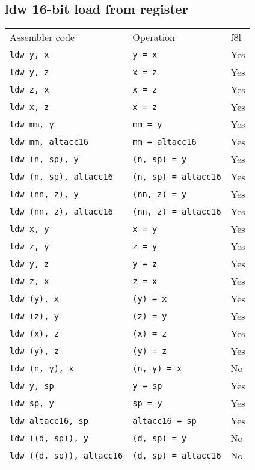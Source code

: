 \documentclass{book}
\begin{document}
\subsection{ldw 16-bit load from register}

\begin{tabular}{l l l}
Assembler code                   & Operation                   & f8l \\
\texttt{ldw y, x}                & \texttt{y = x}              & Yes \\
\texttt{ldw y, z}                & \texttt{x = z}              & Yes \\
\texttt{ldw z, x}                & \texttt{x = z}              & Yes \\
\texttt{ldw x, z}                & \texttt{x = z}              & Yes \\
\texttt{ldw mm, y}               & \texttt{mm = y}             & Yes \\
\texttt{ldw mm, altacc16}        & \texttt{mm = altacc16}      & Yes \\
\texttt{ldw (n, sp), y}          & \texttt{(n, sp) = y}        & Yes \\
\texttt{ldw (n, sp), altacc16}   & \texttt{(n, sp) = altacc16} & Yes \\
\texttt{ldw (nn, z), y}          & \texttt{(nn, z) = y}        & Yes \\
\texttt{ldw (nn, z), altacc16}   & \texttt{(nn, z) = altacc16} & Yes \\
\texttt{ldw x, y}                & \texttt{x = y}              & Yes \\
\texttt{ldw z, y}                & \texttt{z = y}              & Yes \\
\texttt{ldw y, z}                & \texttt{y = z}              & Yes \\
\texttt{ldw z, x}                & \texttt{z = x}              & Yes \\
\texttt{ldw (y), x}              & \texttt{(y) = x}            & Yes \\
\texttt{ldw (z), y}              & \texttt{(z) = y}            & Yes \\
\texttt{ldw (x), z}              & \texttt{(x) = z}            & Yes \\
\texttt{ldw (y), z}              & \texttt{(y) = z}            & Yes \\
\texttt{ldw (n, y), x}           & \texttt{(n, y) = x}         & No \\
\texttt{ldw y, sp}               & \texttt{y = sp}             & Yes \\
\texttt{ldw sp, y}               & \texttt{sp = y}             & Yes \\
\texttt{ldw altacc16, sp}        & \texttt{altacc16 = sp}      & Yes \\
\texttt{ldw ((d, sp)), y}        & \texttt{(d, sp) = y}        & No \\
\texttt{ldw ((d, sp)), altacc16} & \texttt{(d, sp) = altacc16} & No \\
\end{tabular}
\end{document}
